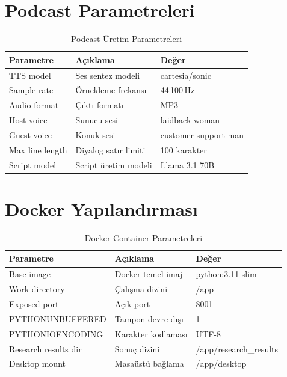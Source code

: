 \section{Podcast Parametreleri}

\begin{table}[H]
\centering
\caption{Podcast \"{U}retim Parametreleri}
\label{tab:podcast_params}
\begin{tabularx}{\textwidth}{lXl}
\toprule
\color{chapterBlue}\textbf{Parametre} & \color{chapterBlue}\textbf{A\c{c}{\i}klama} & \color{chapterBlue}\textbf{De\u{g}er} \\
\midrule
TTS model & Ses sentez modeli & cartesia/sonic \\
Sample rate & \"{O}rnekleme frekans{\i} & 44\,100\,Hz \\
Audio format & \c{C}{\i}kt{\i} format{\i} & MP3 \\
Host voice & Sunucu sesi & laidback woman \\
Guest voice & Konuk sesi & customer support man \\
Max line length & Diyalog sat{\i}r limiti & 100 karakter \\
Script model & Script \"{u}retim modeli & Llama 3.1 70B \\
\bottomrule
\end{tabularx}
\end{table}

\section{Docker Yap{\i}land{\i}rmas{\i}}

\begin{table}[H]
\centering
\caption{Docker Container Parametreleri}
\label{tab:docker_params}
\begin{tabularx}{\textwidth}{lXl}
\toprule
\color{chapterBlue}\textbf{Parametre} & \color{chapterBlue}\textbf{A\c{c}{\i}klama} & \color{chapterBlue}\textbf{De\u{g}er} \\
\midrule
Base image & Docker temel imaj & python:3.11-slim \\
Work directory & \c{C}al{\i}\c{s}ma dizini & /app \\
Exposed port & A\c{c}{\i}k port & 8001 \\
PYTHONUNBUFFERED & Tampon devre d{\i}\c{s}{\i} & 1 \\
PYTHONIOENCODING & Karakter kodlamas{\i} & UTF-8 \\
Research results dir & Sonu\c{c} dizini & /app/research\_results \\
Desktop mount & Masa\"{u}st\"{u} ba\u{g}lama & /app/desktop \\
\bottomrule
\end{tabularx}
\end{table}

